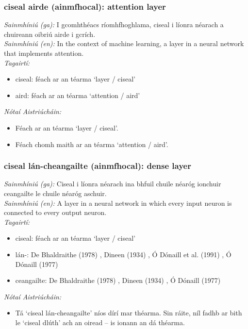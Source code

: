 \subsubsection*{ciseal airde (ainmfhocal): attention layer}
 \noindent \textit{Sainmhíniú (ga):} I gcomhthéacs ríomhfhoghlama, ciseal i líonra néarach a chuireann oibriú airde i gcrích.
\\
 \noindent \textit{Sainmhíniú (en):} In the context of machine learning, a layer in a neural network that implements attention.
\\
 \noindent \textit{Tagairtí:}
\begin{itemize}
	\item ciseal: féach ar an téarma `layer / ciseal'
	\item aird: féach ar an téarma `attention / aird'
\end{itemize}

 \noindent \textit{Nótaí Aistriúcháin:}
\begin{itemize}
	\item Féach ar an téarma `layer / ciseal'.
	\item Féach chomh maith ar an téarma `attention / aird'.
\end{itemize}


\subsubsection*{ciseal lán-cheangailte (ainmfhocal): dense layer}
 \noindent \textit{Sainmhíniú (ga):} Ciseal i líonra néarach ina bhfuil chuile néaróg ionchuir ceangailte le chuile néaróg aschuir.
\\
 \noindent \textit{Sainmhíniú (en):} A layer in a neural network in which every input neuron is connected to every output neuron.
\\
 \noindent \textit{Tagairtí:}
\begin{itemize}
	\item ciseal: féach ar an téarma `layer / ciseal'
	\item lán-: De Bhaldraithe (1978) \cite{de-bhaldraithe}, Dineen (1934) \cite{dineen}, Ó Dónaill et al. (1991) \cite{focloir-beag}, Ó Dónaill (1977) \cite{odonaill}
	\item ceangailte: De Bhaldraithe (1978) \cite{de-bhaldraithe}, Dineen (1934) \cite{dineen}, Ó Dónaill (1977) \cite{odonaill}
\end{itemize}

 \noindent \textit{Nótaí Aistriúcháin:}
\begin{itemize}
	\item Tá `ciseal lán-cheangailte' níos dírí mar théarma. Sin ráite, níl fadhb ar bith le `ciseal dlúth' ach an oiread -- is ionann an dá théarma.
\end{itemize}


